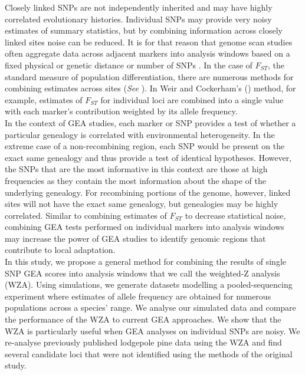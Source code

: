 \documentclass[10pt,twoside,lineno]{GSA_format}
\begin{document}
Closely linked SNPs are not independently inherited and may have highly correlated evolutionary histories. Individual SNPs may provide very noisy estimates of summary statistics, but by combining information across closely linked sites noise can be reduced. It is for that reason that genome scan studies often aggregate data across adjacent markers into analysis windows based on a fixed physical or genetic distance or number of SNPs \citep{Hoban2016}. In the case of $F_{ST}$, the standard measure of population differentiation, there are numerous methods for combining estimates across sites (\textit{See} \citealt{Bhatia2013}). In Weir and Cockerham's (\citeyear{Weir1984-tc}) method, for example, estimates of $F_{ST}$ for individual loci are combined into a single value with each marker's contribution weighted by its allele frequency. \\

In the context of GEA studies, each marker or SNP provides a test of whether a particular genealogy is correlated with environmental heterogeneity. In the extreme case of a non-recombining region, each SNP would be present on the exact same genealogy and thus provide a test of identical hypotheses. However, the SNPs that are the most informative in this context are those at high frequencies as they contain the most information about the shape of the underlying genealogy. For recombining portions of the genome, however, linked sites will not have the exact same genealogy, but genealogies may be highly correlated. Similar to combining estimates of $F_{ST}$ to decrease statistical noise, combining GEA tests performed on individual markers into analysis windows may increase the power of GEA studies to identify genomic regions that contribute to local adaptation. \\

In this study, we propose a general method for combining the results of single SNP GEA scores into analysis windows that we call the weighted-Z analysis (WZA). Using simulations, we generate datasets modelling a pooled-sequencing experiment where estimates of allele frequency are obtained for numerous populations across a species' range. We analyse our simulated data and compare the performance of the WZA to current GEA approaches. We show that the WZA is particularly useful when GEA analyses on individual SNPs are noisy. We re-analyse previously published lodgepole pine data using the WZA and find several candidate loci that were not identified using the methods of the original study. 
\end{document}
